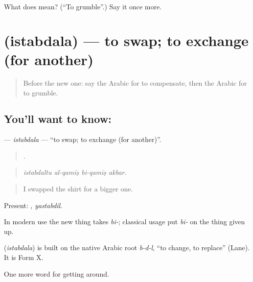 \begin{tcolorbox}[breakable,colback=teal!4,colframe=teal!35!black,title={Before you move on}]
What does  mean? (\textquotedblleft{}To grumble\textquotedblright{}.) Say it once more.
\end{tcolorbox}
\section[\texorpdfstring{\ar{استبدل} (istabdala)}{استبدل (istabdala)}]{ (istabdala) — to swap; to exchange (for another)}

\label{lesson:AR-C449-istabdala}



\begin{quote}
Before the new one: say the Arabic for to compensate, then the Arabic for to grumble.
\end{quote}

\subsection*{You'll want to know: }
\textbf{} — \emph{istabdala} — \textquotedblleft{}to swap; to exchange (for another)\textquotedblright{}.

\begin{quote}
   .
\end{quote}

\begin{quote}
\emph{istabdaltu al-qamīṣ bi-qamīṣ akbar.}
\end{quote}

\begin{quote}
I swapped the shirt for a bigger one.
\end{quote}

Present: , \emph{yastabdil}.

In modern use the new thing takes \emph{bi-}; classical usage put \emph{bi-} on the thing given up.

\begin{cousinweb}
\textbf{} (\emph{istabdala}) is built on the native Arabic root \emph{b-d-l}, \textquotedblleft{}to change, to replace\textquotedblright{} (Lane). It is Form X.
\end{cousinweb}

\begin{grammarlens}[title={What you've built}]
One more word for getting around.
\end{grammarlens}

